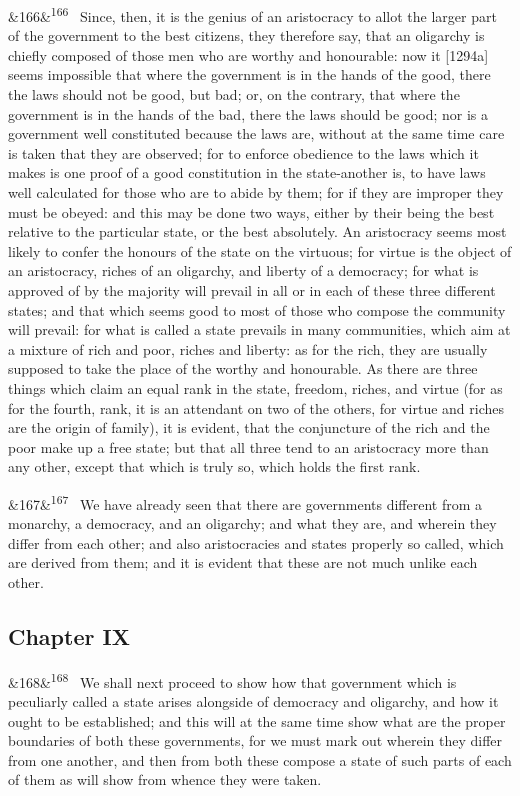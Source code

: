 \documentclass[12pt]{article}
\newcommand{\para}[1][]{\par\noindent\ifx&#1&\else\textsuperscript{\footnotesize #1}~\fi}
\begin{document}
\para[166] Since, then, it is the genius of an aristocracy to allot the larger part of the government to the best citizens, they therefore say, that an oligarchy is chiefly composed of those men who are worthy and honourable: now it [1294a] seems impossible that where the government is in the hands of the good, there the laws should not be good, but bad; or, on the contrary, that where the government is in the hands of the bad, there the laws should be good; nor is a government well constituted because the laws are, without at the same time care is taken that they are observed; for to enforce obedience to the laws which it makes is one proof of a good constitution in the state-another is, to have laws well calculated for those who are to abide by them; for if they are improper they must be obeyed: and this may be done two ways, either by their being the best relative to the particular state, or the best absolutely. An aristocracy seems most likely to confer the honours of the state on the virtuous; for virtue is the object of an aristocracy, riches of an oligarchy, and liberty of a democracy; for what is approved of by the majority will prevail in all or in each of these three different states; and that which seems good to most of those who compose the community will prevail: for what is called a state prevails in many communities, which aim at a mixture of rich and poor, riches and liberty: as for the rich, they are usually supposed to take the place of the worthy and honourable. As there are three things which claim an equal rank in the state, freedom, riches, and virtue (for as for the fourth, rank, it is an attendant on two of the others, for virtue and riches are the origin of family), it is evident, that the conjuncture of the rich and the poor make up a free state; but that all three tend to an aristocracy more than any other, except that which is truly so, which holds the first rank.

\para[167] We have already seen that there are governments different from a monarchy, a democracy, and an oligarchy; and what they are, and wherein they differ from each other; and also aristocracies and states properly so called, which are derived from them; and it is evident that these are not much unlike each other.

\subsection*{Chapter IX}

\para[168] We shall next proceed to show how that government which is peculiarly called a state arises alongside of democracy and oligarchy, and how it ought to be established; and this will at the same time show what are the proper boundaries of both these governments, for we must mark out wherein they differ from one another, and then from both these compose a state of such parts of each of them as will show from whence they were taken.
\end{document}
